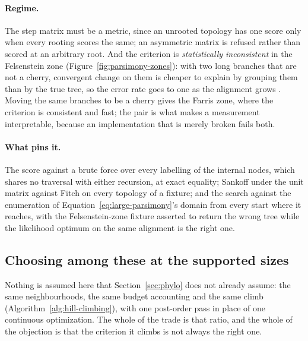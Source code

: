 \documentclass[11pt,a4paper]{article}
\begin{document}
\paragraph{Regime.}
The step matrix must be a metric, since an unrooted topology has one score
only when every rooting scores the same; an asymmetric matrix is refused
rather than scored at an arbitrary root. And the criterion is
\emph{statistically inconsistent} in the Felsenstein zone
(Figure~\ref{fig:parsimony-zones}): with two long branches that are not a
cherry, convergent change on them is cheaper to explain by grouping them than
by the true tree, so the error rate goes to one as the alignment grows
\citep{felsenstein2004}. Moving the same branches to be a cherry gives the
Farris zone, where the criterion is consistent and fast; the pair is what
makes a measurement interpretable, because an implementation that is merely
broken fails both.

\paragraph{What pins it.}
The score against a brute force over every labelling of the internal nodes,
which shares no traversal with either recursion, at exact equality; Sankoff
under the unit matrix against Fitch on every topology of a fixture; and the
search against the enumeration of Equation~\ref{eq:large-parsimony}'s domain
from every start where it reaches, with the Felsenstein-zone fixture asserted
to return the wrong tree while the likelihood optimum on the same alignment
is the right one.

\subsection{Choosing among these at the supported sizes}
\label{sec:parsimony:discussion}
Nothing is assumed here that Section~\ref{sec:phylo} does not already
assume: the same neighbourhoods, the same budget accounting and the same
climb (Algorithm~\ref{alg:hill-climbing}), with one post-order pass in place
of one continuous optimization. The whole of the trade is that ratio, and
the whole of the objection is that the criterion it climbs is not always the
right one.
\end{document}
